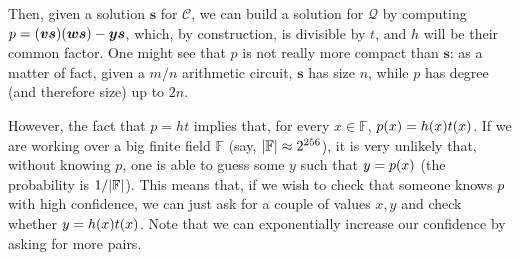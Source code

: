 Then, given a solution \(\bm{s}\) for \(\mathcal{C}\), we can build a solution for \(\mathcal{Q}\)
by computing \(p = \Parens*{\bm{v}\bm{s}}\Parens*{\bm{w}\bm{s}} - \bm{y}\bm{s}\), which, by 
construction, is divisible by \(t\), and \(h\) will be their common factor.
One might see that \(p\) is not really more compact than \(\bm{s}\): 
as a matter of fact, given a \(m/n\) arithmetic circuit, \(\bm{s}\) has size \(n\), while 
\(p\) has degree (and therefore size) up to \(2n\).

However, the fact that \(p = ht\) implies that, for every \(x \in \mathbb{F}\), 
\(\call{p}{x} = \call{h}{x}\call{t}{x}\).
If we are working over a big finite field \(\mathbb{F}\) 
(say, \(\left\lvert\mathbb{F}\right\rvert \approx 2^{256}\)), it is very unlikely that, without knowing \(p\), one 
is able to guess some \(y\) such that \(y = \call{p}{x}\) 
(the probability is \(1/{\left\lvert\mathbb{F}\right\rvert}\)).
This means that, if we wish to check that someone knows \(p\) with high confidence, we can just 
ask for a couple of values \(x, y\) and check whether \(y = \call{h}{x}\call{t}{x}\).
Note that we can exponentially increase our confidence by asking for more pairs.
